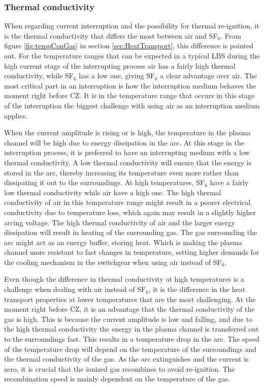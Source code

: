 \documentclass[10pt,a4paper]{article}
\begin{document}
\subsubsection*{Thermal conductivity}
When regarding current interruption and the possibility for thermal re-ignition, it is the thermal conductivity that differs the most between air and SF$_{6}$. From figure \ref{fig:tempConGas} in section \ref{sec:HeatTransport}, this difference is pointed out. For the temperature ranges that can be expected in a typical LBS during the high current stage of the interrupting process air has a fairly high thermal conductivity, while SF$_6$ has a low one, giving SF$_6$ a clear advantage over air. The most critical part in an interruption is how the interruption medium behaves the moment right before CZ. It is in the temperature range that occurs in this stage of the interruption the biggest challenge with using air as an interruption medium applies.

When the current amplitude is rising or is high, the temperature in the plasma channel will be high due to energy dissipation in the arc. At this stage in the interruption process, it is preferred to have an interrupting medium with a low thermal conductivity. A low thermal conductivity will ensure that the energy is stored in the arc, thereby increasing its temperature even more rather than dissipating it out to the surroundings. At high temperatures, SF$_6$ have a fairly low thermal conductivity while air have a high one. The high thermal conductivity of air in this temperature range might result in a poorer electrical conductivity due to temperature loss, which again may result in a slightly higher arcing voltage. The high thermal conductivity of air and the larger energy dissipation will result in heating of the surrounding gas. The gas surrounding the arc might act as an energy buffer, storing heat. Which is making the plasma channel more resistant to fast changes in temperature, setting higher demands for the cooling mechanism in the switchgear when using air instead of SF$_6$.

Even though the difference in thermal conductivity at high temperatures is a challenge when dealing with air instead of SF$_6$, it is the difference in the heat transport properties at lower temperatures that are the most challenging. At the moment right before CZ, it is an advantage that the thermal conductivity of the gas is high. This is because the current amplitude is low and falling, and due to the high thermal conductivity the energy in the plasma channel is transferred out to the surroundings fast. This results in a temperature drop in the arc. The speed of the temperature drop will depend on the temperature of the surroundings and the thermal conductivity of the gas. As the arc extinguishes and the current is zero, it is crucial that the ionized gas recombines to avoid re-ignition. The recombination speed is mainly dependent on the temperature of the gas. 
\end{document}
